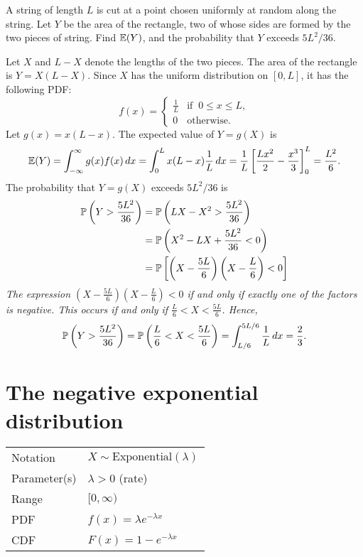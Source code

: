 \begin{example}
A string of length $L$ is cut at a point chosen uniformly at random along the string. Let $Y$ be the area of the rectangle, two of whose sides are formed by the two pieces of string. Find $\mathbb{E}(Y)$, and the probability that $Y$ exceeds $5L^2/36$.
\end{example}
\begin{solution}
Let $X$ and $L-X$ denote the lengths of the two pieces. The area of the rectangle is $Y=X(L-X)$. Since $X$ has the uniform distribution on $[0,L]$, it has the following PDF:
\[
f(x) = \begin{cases}
	\displaystyle\frac{1}{L}	& \text{if }\ 0\leq x\leq L, \\[2ex]
	0			& \text{otherwise}.	
\end{cases}
\]
Let $g(x)=x(L-x)$. The expected value of $Y=g(X)$ is
\begin{align*}
\mathbb{E}(Y)
	= \int_{-\infty}^{\infty} g(x)f(x)\,dx 
	= \int_0^L x(L-x)\frac{1}{L}\,dx 
	= \frac{1}{L}\left[\frac{Lx^2}{2}-\frac{x^3}{3}\right]_0^L 
	= \frac{L^2}{6}.
\end{align*}
The probability that $Y=g(X)$ exceeds $5L^2/36$ is
\begin{align*}
\mathbb{P}\left(Y>\frac{5L^2}{36}\right)	
	& = \mathbb{P}\left(LX - X^2 > \frac{5L^2}{36}\right) \\
	& = \mathbb{P}\left(X^2 - LX + \frac{5L^2}{36} < 0 \right) \\
	& = \mathbb{P}\left[\left(X-\frac{5L}{6}\right)\left(X-\frac{L}{6}\right) < 0\right]
\end{align*}
\bit
\it The expression $\displaystyle\left(X-\frac{5L}{6}\right)\left(X-\frac{L}{6}\right) < 0$ if and only if exactly one of the factors is negative. 
\it This occurs if and only if $\displaystyle\frac{L}{6} < X < \frac{5L}{6}$.
\eit
Hence,
\[
\mathbb{P}\left(Y>\frac{5L^2}{36}\right)
	= \mathbb{P}\left(\frac{L}{6} < X < \frac{5L}{6}\right)
	= \int_{L/6}^{5L/6} \frac{1}{L}\,dx = \frac{2}{3}.
\]	
\end{solution}

\section{The negative exponential distribution}
\begin{center}
\begin{tabular}{ll}\hline
Notation			& $X\sim\text{Exponential}(\lambda)$ \\
Parameter(s)		& $\lambda>0$ \quad (rate) \\
Range			& $[0,\infty)$ \\
PDF				& $f(x) = \lambda e^{-\lambda x}$ \\
CDF				& $F(x) = 1 - e^{-\lambda x}$ \\ \hline
\end{tabular}
\end{center}

